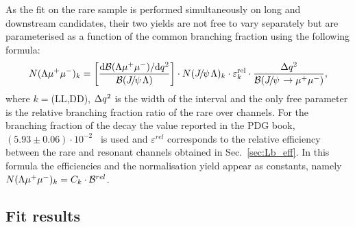 As the fit on the rare sample is performed simultaneously on long and downstream candidates,
their two yields are not free to vary separately but are parameterised
as a function of the common branching fraction using the following formula:
%
\begin{equation}
N(\Lz\mumu)_{k}  = \left[ \frac{\mathrm{d}\mathcal{B}(\Lz\mumu)/\mathrm{d}\qsq}{\mathcal{B}(\jpsi\Lz)} \right]  \cdot
N(\jpsi\Lz)_{k} \cdot \varepsilon^{\mathrm{rel}}_{k} \cdot \frac {\Delta\qsq} { \mathcal{B}(\jpsi\to\mumu) },
\label{eq:relYield}
\end{equation}
%
where $k = $(LL,DD), $\Delta q^2$ is the width of the \qsq interval and the only free parameter is the relative branching 
fraction ratio of the rare over \jpsi channels. For the branching fraction of the \jpsi\to\mumu decay the value 
reported in the PDG book, \mbox{$(5.93 \pm 0.06)\cdot 10^{-2}$~\cite{PDG2014}} is used and $\varepsilon^{rel}$ corresponds to
the relative efficiency between the rare and resonant channels obtained in Sec.~\ref{sec:Lb_eff}. 
In this formula the efficiencies and the normalisation yield appear as constants, namely 
$N(\Lambda\mu^+\mu^-)_{k} = C_k \cdot \mathcal{B}^{rel}$. 


\subsection{Fit results}



